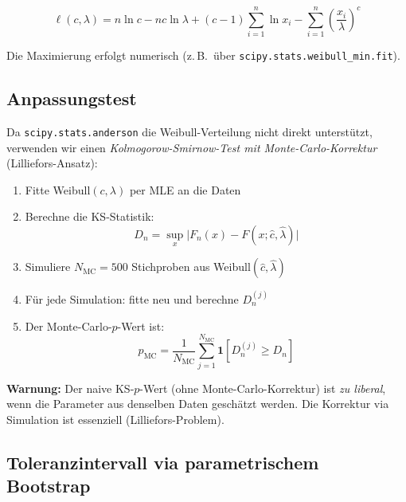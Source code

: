\documentclass[10pt,a4paper,twocolumn]{article}
\theoremstyle{definition}
\newcommand{\warnung}[1]{%
    \begin{center}
    \colorbox{warnred}{\parbox{0.92\linewidth}{\small\textbf{Warnung:} #1}}
    \end{center}
}
\begin{document}
\begin{equation}
    \ell(c, \lambda) = n \ln c - n c \ln \lambda
    + (c-1)\sum_{i=1}^n \ln x_i
    - \sum_{i=1}^n \left(\frac{x_i}{\lambda}\right)^c
    \label{eq:weibull_loglik}
\end{equation}

Die Maximierung erfolgt numerisch (z.\,B.\ über
\texttt{scipy.stats.weibull\_min.fit}).

\subsection{Anpassungstest}

Da \texttt{scipy.stats.anderson} die Weibull-Verteilung nicht direkt
unterstützt, verwenden wir einen \emph{Kolmogorow-Smirnow-Test mit
Monte-Carlo-Korrektur} (Lilliefors-Ansatz):

\begin{enumerate}[nosep,leftmargin=*]
    \item Fitte Weibull$(c, \lambda)$ per MLE an die Daten
    \item Berechne die KS-Statistik:
        \begin{equation}
            D_n = \sup_x \big|F_n(x) - F(x; \hat{c}, \hat{\lambda})\big|
            \label{eq:ks_stat}
        \end{equation}
    \item Simuliere $N_{\text{MC}} = 500$ Stichproben aus
          Weibull$(\hat{c}, \hat{\lambda})$
    \item Für jede Simulation: fitte neu und berechne $D_n^{(j)}$
    \item Der Monte-Carlo-$p$-Wert ist:
        \begin{equation}
            p_{\text{MC}} = \frac{1}{N_{\text{MC}}}
            \sum_{j=1}^{N_{\text{MC}}} \mathbf{1}[D_n^{(j)} \geq D_n]
            \label{eq:mc_pvalue}
        \end{equation}
\end{enumerate}

\warnung{Der naive KS-$p$-Wert (ohne Monte-Carlo-Korrektur) ist
\emph{zu liberal}, wenn die Parameter aus denselben Daten geschätzt
werden. Die Korrektur via Simulation ist essenziell
(Lilliefors-Problem).}

\subsection{Toleranzintervall via parametrischem Bootstrap}
\end{document}
